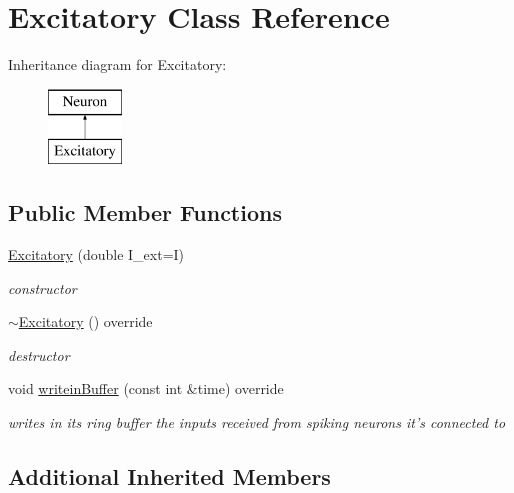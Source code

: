 \hypertarget{classExcitatory}{\section{Excitatory Class Reference}
\label{classExcitatory}
}
Inheritance diagram for Excitatory\-:\begin{figure}[H]
\begin{center}
\leavevmode
\includegraphics[height=2.000000cm]{classExcitatory}
\end{center}
\end{figure}
\subsection*{Public Member Functions}
\begin{DoxyCompactItemize}
\item 
\hyperlink{classExcitatory_a62afe8d17694d8b435ca5a289cd3b2eb}{Excitatory} (double I\-\_\-ext=I)
\begin{DoxyCompactList}\small\item\em constructor \end{DoxyCompactList}\item 
\hyperlink{classExcitatory_a06f2bb4a4a37cd215dfa453db9ba7424}{$\sim$\-Excitatory} () override
\begin{DoxyCompactList}\small\item\em destructor \end{DoxyCompactList}\item 
void \hyperlink{classExcitatory_a62f52a9cc2851b290357d7f4613b9070}{writein\-Buffer} (const int \&time) override
\begin{DoxyCompactList}\small\item\em writes in its ring buffer the inputs received from spiking neurons it's connected to \end{DoxyCompactList}\end{DoxyCompactItemize}
\subsection*{Additional Inherited Members}


